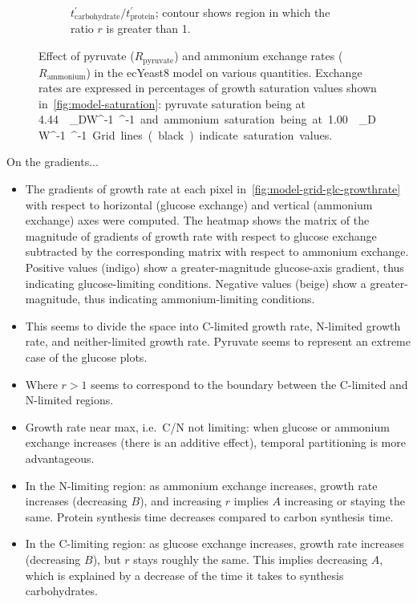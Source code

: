 \begin{figure}
\begin{subfigure}[t]{0.45\textwidth}
    \caption{
      $t_{\mathrm{carbohydrate}}^{\prime}/t_{\mathrm{protein}}^{\prime}$;
      contour shows region in which the ratio $r$ is greater than 1.
    }
    \label{fig:model-grid-pyr-carb-to-prot}
  \end{subfigure}
  \caption{
    Effect of pyruvate ($R_{\mathrm{pyruvate}}$) and ammonium exchange rates ($R_{{\mathrm{ammonium}}}$) in the ecYeast8 model on various quantities.
    Exchange rates are expressed in percentages of growth saturation values shown in~\ref{fig:model-saturation}: pyruvate saturation being at \SI{4.44}{\milli\mole~\gram_{DW}^{-1}~\hour^{-1}} and ammonium saturation being at \SI{1.00}{\milli\mole~\gram_{DW}^{-1}~\hour^{-1}}.
    Grid lines (black) indicate saturation values.
  }
  \label{fig:model-grid-pyr}
\end{figure}

On the gradients...
\begin{itemize}
  \item The gradients of growth rate at each pixel in~\ref{fig:model-grid-glc-growthrate} with respect to horizontal (glucose exchange) and vertical (ammonium exchange) axes were computed.
        The heatmap shows the matrix of the magnitude of gradients of growth rate with respect to glucose exchange subtracted by the corresponding matrix with respect to ammonium exchange.
        Positive values (indigo) show a greater-magnitude glucose-axis gradient, thus indicating glucose-limiting conditions.
        Negative values (beige) show a greater-magnitude, thus indicating ammonium-limiting conditions.
  \item This seems to divide the space into C-limited growth rate, N-limited growth rate, and neither-limited growth rate.
        Pyruvate seems to represent an extreme case of the glucose plots.
  \item Where $r > 1$ seems to correspond to the boundary between the C-limited and N-limited regions.
  \item Growth rate near max, i.e.\ C/N not limiting: when glucose or ammonium exchange increases (there is an additive effect), temporal partitioning is more advantageous.
  \item In the N-limiting region: as ammonium exchange increases, growth rate increases (decreasing $B$), and increasing $r$ implies $A$ increasing or staying the same.
        Protein synthesis time decreases compared to carbon synthesis time.
  \item In the C-limiting region: as glucose exchange increases, growth rate increases (decreasing $B$), but $r$ stays roughly the same.
        This implies decreasing $A$, which is explained by a decrease of the time it takes to synthesis carbohydrates.
\end{itemize}

